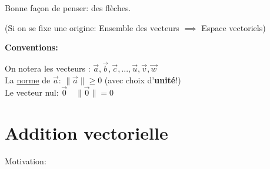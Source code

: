 \documentclass[
    11pt,
    a4paper,
    oneside,
    headinlcude, footinclude,
    twoside,
]{report}
\renewcommand{\vec}[1]{\overrightarrow{#1}}
\begin{document}
Bonne façon de penser: des flèches.

(Si on se fixe une origine: Ensemble des vecteurs $\implies$ Espace vectoriels)

\vspace{.5cm}

\textbf{Conventions:}

On notera les vecteurs : $\vec a, \vec b, \vec c, ..., \vec u, \vec v, \vec w$\\
La \underline{norme} de $\vec a$: $\| \vec a \| \geq 0$ (avec choix d'\textbf{unité}!)\\
Le vecteur nul: $\vec 0 \quad \| \vec 0 \| = 0$


\section{Addition vectorielle}
\label{sec:addition_vectorielle}

Motivation:
\end{document}
